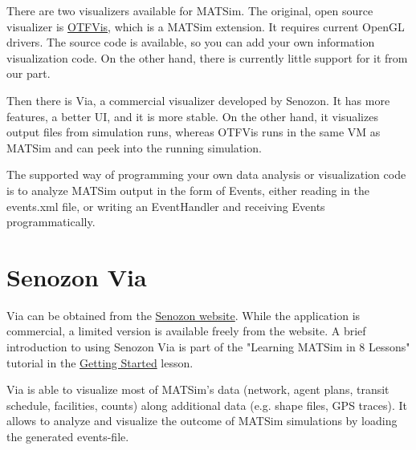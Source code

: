 There are two visualizers available for MATSim. The original, open source 
visualizer is \href{http://matsim.org/docs/extensions/otfvis}{OTFVis}, which is
a MATSim extension. It requires current OpenGL drivers. The source code is 
available, so you can add your own information visualization code. On the 
other hand, there is currently little support for it from our part.

Then there is Via, a commercial visualizer developed by Senozon. It  has more
features, a better UI, and it is more stable. On the other hand, it visualizes
output files from simulation runs, whereas OTFVis runs in the same VM as
MATSim and can peek into the running simulation.

The supported way of programming your own data analysis or visualization code
is to analyze MATSim output in the form of Events, either reading in the 
events.xml file, or writing an EventHandler and receiving Events programmatically.

\section{Senozon Via}

Via can be obtained from the \href{http://senozon.com/products/via}{Senozon website}.
While the application is commercial, a limited version is available freely from the website. 
A brief introduction to using Senozon Via is part of the "Learning MATSim in 8 Lessons"
tutorial in the \href{http://www.matsim.org/docs/tutorials/8lessons/getting-started}{Getting Started} lesson.

Via is able to visualize most of MATSim's data (network, agent plans, transit schedule, facilities, counts)
along additional data (e.g. shape files, GPS traces).
It allows to analyze and visualize the outcome of MATSim simulations by loading the generated events-file.


